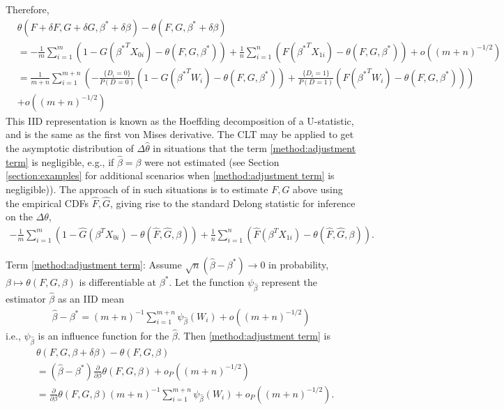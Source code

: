 \documentclass[12pt]{article}
\renewcommand{\P}{P}
\newcommand{\X}[1][]{X_{0#1}}
\newcommand{\Y}[1][]{X_{1#1}}
\newcommand{\W}[1][]{W_{#1}}
\newcommand{\D}[1][]{D_{#1}}
\renewcommand{\t}[1]{{#1}^T}
\renewcommand{\star}[1]{{#1}^\ast}
\newcommand{\infl}[1][]{\psi_{#1}}
\newcommand{\F}{F}
\newcommand{\G}{G}
\newcommand{\m}{m}
\newcommand{\n}{n}
\newcommand{\N}{m+n}
\newcommand{\auc}{\theta}
\newcommand{\aucdiff}{\Delta\auc}
\newcommand{\aucdiffhat}{\Delta\hat{\auc}}
\theoremstyle{definition}
\begin{document}
Therefore,
\begin{align}
  &\auc(\F+\delta\F,\G+\delta\G,\star\beta+\delta\beta) - \auc(\F,\G,\star\beta+\delta\beta) \\%
  &=-\frac{1}{\m}\sum_{i=1}^\m(1-\G(\t{\star\beta}\X[i])-\auc(\F,\G,\star\beta)) + \frac{1}{\n}\sum_{i=1}^\n(\F(\t{\star\beta}\Y[i])-\auc(\F,\G,\star\beta))+ o((\N)^{-1/2})\\
    &=\frac{1}{\N}\sum_{i=1}^{\N}\left(-\frac{\{\D[i]=0\}}{\P(\D=0)}(1-\G(\t{\star\beta}\W[i])-\auc(\F,\G,\star\beta)) + \frac{\{\D[i]=1\}}{\P(\D=1)}(\F(\t{\star\beta}\W[i])-\auc(\F,\G,\star\beta))\right)\\
  &+ o((\N)^{-1/2}) \label{method:hoeffding}
\end{align}
This IID representation is known as the
Hoeffding decomposition of a U-statistic, and is the same as the first
von Mises derivative. %
The CLT may be applied to get the asymptotic distribution of
$\aucdiffhat$ in situations that the term \eqref{method:adjustment term} is
negligible, e.g., if $\hat\beta=\beta$ were not estimated (see Section \ref{section:examples}
for additional scenarios when \eqref{method:adjustment term} is
negligible)). The approach of \citet{delong1988} in such situations is to estimate
$\F,\G$ above using the empirical CDFs $\hat\F,\hat\G$,
giving rise to the standard Delong statistic for inference on the
$\aucdiff$,
\begin{align}
  -\frac{1}{\m}\sum_{i=1}^\m(1-\hat\G(\t{\beta}\X[i])-\auc(\hat\F,\hat\G,\beta)) + \frac{1}{\n}\sum_{i=1}^\n(\hat\F(\t{\beta}\Y[i])-\auc(\hat\F,\hat\G,\beta)).
\end{align}



Term \eqref{method:adjustment term}: Assume
$\sqrt{n}(\hat\beta-\star\beta)\to 0$ in probability,
$\beta\mapsto\auc(\F,\G,\beta)$ is differentiable at $\star\beta$. Let
the function $\infl[\hat\beta]$ represent the estimator $\hat\beta$ as
an IID mean
\begin{align}
  \hat\beta-\star\beta=(\N)^{-1}\sum_{i=1}^{\m+\n}\infl[\hat\beta](\W[i]) + o((\N)^{-1/2})
\end{align}
i.e., $\infl[\hat\beta]$ is an influence function for the $\hat\beta$. Then \eqref{method:adjustment term} is
\begin{align}
  &\auc(\F,\G,\beta+\delta\beta)-\auc(\F,\G,\beta)  \\
  &=(\hat\beta-\star\beta)\frac{\partial}{\partial\beta}\auc(\F,\G,\beta) + o_P((\N)^{-1/2})\\
  &=\frac{\partial}{\partial\beta}\auc(\F,\G,\beta)(\N)^{-1}\sum_{i=1}^{\m+\n}\infl[\hat\beta](\W[i]) + o_P((\N)^{-1/2}).
\end{align}
\end{document}
